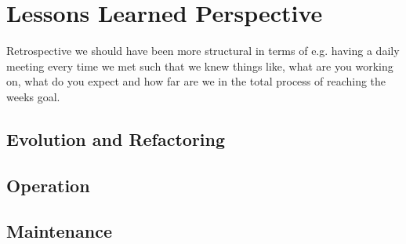 \section{Lessons Learned Perspective}
Retrospective we should have been more structural in terms of e.g. having a daily meeting every 
time we met such that we knew things like, what are you working on, what do you expect and how far are we in the total process of reaching the weeks goal.

\subsection{Evolution and Refactoring}

\subsection{Operation}

\subsection{Maintenance}